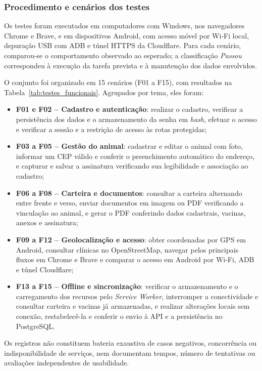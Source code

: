 \documentclass{UNESC}
\begin{document}
\subsubsection{Procedimento e cenários dos testes}

Os testes foram executados em computadores com Windows, nos navegadores Chrome e Brave, e em dispositivos Android, com acesso móvel por Wi-Fi local, depuração USB com ADB e túnel HTTPS da Cloudflare. Para cada cenário, comparou-se o comportamento observado ao esperado; a classificação \textit{Passou} correspondeu à execução da tarefa prevista e à manutenção dos dados envolvidos.

O conjunto foi organizado em 15 cenários (F01 a F15), com resultados na Tabela~\ref{tab:testes_funcionais}. Agrupados por tema, eles foram:

\begin{itemize}
    \item \textbf{F01 e F02 -- Cadastro e autenticação}: realizar o cadastro, verificar a persistência dos dados e o armazenamento da senha em \textit{hash}, efetuar o acesso e verificar a sessão e a restrição de acesso às rotas protegidas;
    \item \textbf{F03 a F05 -- Gestão do animal}: cadastrar e editar o animal com foto, informar um CEP válido e conferir o preenchimento automático do endereço, e capturar e salvar a assinatura verificando sua legibilidade e associação ao cadastro;
    \item \textbf{F06 a F08 -- Carteira e documentos}: consultar a carteira alternando entre frente e verso, enviar documentos em imagem ou PDF verificando a vinculação ao animal, e gerar o PDF conferindo dados cadastrais, vacinas, anexos e assinatura;
    \item \textbf{F09 a F12 -- Geolocalização e acesso}: obter coordenadas por GPS em Android, consultar clínicas no OpenStreetMap, navegar pelos principais fluxos em Chrome e Brave e comparar o acesso em Android por Wi-Fi, ADB e túnel Cloudflare;
    \item \textbf{F13 a F15 -- Offline e sincronização}: verificar o armazenamento e o carregamento dos recursos pelo \textit{Service Worker}, interromper a conectividade e consultar carteira e vacinas já armazenadas, e realizar alterações locais sem conexão, restabelecê-la e conferir o envio à API e a persistência no PostgreSQL.
\end{itemize} Os registros não constituem bateria exaustiva de casos negativos, concorrência ou indisponibilidade de serviços, nem documentam tempos, número de tentativas ou avaliações independentes de usabilidade.
\end{document}
